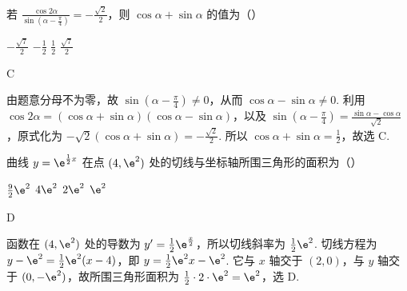 \begin{problem}
若 \(\frac{\cos 2\alpha}{\sin \left(\alpha - \frac{\pi}{4}\right)} = -\frac{\sqrt{2}}{2}\)，则 \(\cos \alpha + \sin \alpha\) 的值为（\quad）

\choices
    {\(-\frac{\sqrt{7}}{2}\)}
    {\(-\frac{1}{2}\)}
    {\( \frac{1}{2} \)}
    {\(\frac{\sqrt{7}}{2}\)}
\end{problem}

\begin{answer}
C
\end{answer}

\begin{solution}
由题意分母不为零，故 \(\sin(\alpha-\frac{\pi}{4})\neq0\)，从而 \(\cos\alpha-\sin\alpha\neq0\). 利用
\(\cos2\alpha=(\cos\alpha+\sin\alpha)(\cos\alpha-\sin\alpha)\)，以及 \(\sin(\alpha-\frac{\pi}{4})=\frac{\sin\alpha-\cos\alpha}{\sqrt{2}}\)，原式化为
\(-\sqrt{2}(\cos\alpha+\sin\alpha)=-\frac{\sqrt{2}}{2}\). 所以 \(\cos\alpha+\sin\alpha=\frac{1}{2}\)，故选 C.
\end{solution}

\begin{problem}
曲线 \( y = \e^{\frac{1}{2} x} \) 在点 \((4, \e^2)\) 处的切线与坐标轴所围三角形的面积为（\quad）

\choices
    {\(\frac{9}{2}\e^2\)}
    {\(4\e^2\)}
    {\(2\e^{2}\)}
    {\(\e^2\)}
\end{problem}

\begin{answer}
D
\end{answer}

\begin{solution}
函数在 \((4,\e^2)\) 处的导数为 \(y'=\frac{1}{2}\e^{\frac{x}{2}}\)，所以切线斜率为 \(\frac{1}{2}\e^2\). 切线方程为
\(y-\e^2=\frac{1}{2}\e^2(x-4)\)，即 \(y=\frac{1}{2}\e^2x-\e^2\). 它与 \(x\) 轴交于 \((2,0)\)，与 \(y\) 轴交于 \((0,-\e^2)\)，故所围三角形面积为 \(\frac{1}{2}\cdot2\cdot\e^2=\e^2\)，选 D.
\end{solution}

